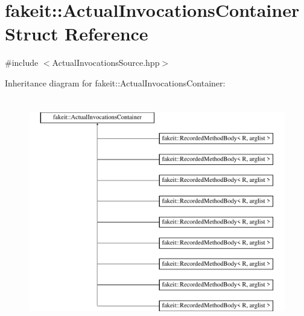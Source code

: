 \hypertarget{structfakeit_1_1ActualInvocationsContainer}{}\section{fakeit\+::Actual\+Invocations\+Container Struct Reference}
\label{structfakeit_1_1ActualInvocationsContainer}


{\ttfamily \#include $<$Actual\+Invocations\+Source.\+hpp$>$}

Inheritance diagram for fakeit\+::Actual\+Invocations\+Container\+:\begin{figure}[H]
\begin{center}
\leavevmode
\includegraphics[height=10.000000cm]{structfakeit_1_1ActualInvocationsContainer}
\end{center}
\end{figure}
